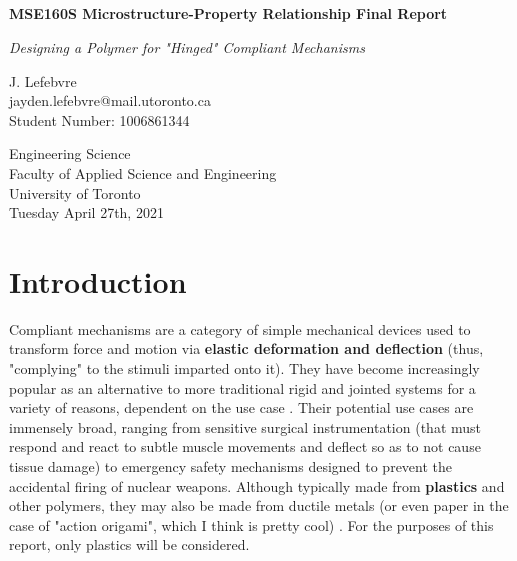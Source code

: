 \documentclass{report}
\title{\\\large{}}
\author{}
\begin{document}
\begin{titlepage}
    \begin{center}
        \vspace*{1cm}
 
        \textbf{MSE160S Microstructure-Property Relationship Final Report}
 
        \vspace{0.5cm}
        \textit{Designing a Polymer for "Hinged" Compliant Mechanisms}
             
        \vspace{1.5cm}
 
        J. Lefebvre\\\small{jayden.lefebvre@mail.utoronto.ca}\\\small{Student Number: 1006861344}
 
        \vfill
             
        \vspace{0.8cm}
             
        Engineering Science\\
        Faculty of Applied Science and Engineering\\
        University of Toronto\\
        Tuesday April 27th, 2021
             
    \end{center}
 \end{titlepage}


\section{Introduction}

Compliant mechanisms are a category of simple mechanical devices used to transform force and motion via \textbf{elastic deformation and deflection} (thus, "complying" to the stimuli imparted onto it).
They have become increasingly popular as an alternative to more traditional rigid and jointed systems for a variety of reasons, dependent on the use case \cite{compliant}.
Their potential use cases are immensely broad, ranging from sensitive surgical instrumentation (that must respond and react to subtle muscle movements and deflect so as to not cause tissue damage) to emergency safety mechanisms designed to prevent the accidental firing of nuclear weapons\cite{invention}.
Although typically made from \textbf{plastics} and other polymers, they may also be made from ductile metals (or even paper in the case of "action origami", which I think is pretty cool) \cite{invention}. For the purposes of this report, only plastics will be considered.
\end{document}
